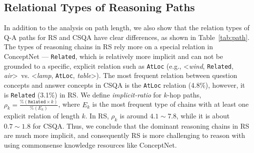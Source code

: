 \subsection{Relational Types of Reasoning Paths}
In addition to the analysis on path length, we also show that the relation types of Q-A paths for RS and CSQA have clear differences, as shown in Table~\ref{tab:path}.
The types of reasoning chains in RS rely more on a special relation in ConceptNet --- \texttt{Related}, which is relatively more implicit and can not be grounded to a specific, explicit relation such as \texttt{AtLoc} (e.g., \textless\textit{wind}, \texttt{Related}, \textit{air}\textgreater ~vs. \textless\textit{lamp}, \texttt{AtLoc}, \textit{table}\textgreater).
The most frequent relation between question concepts and answer concepts in CSQA is the \texttt{AtLoc} relation (4.8\%), however, it is \texttt{Related} (3.1\%) in RS.
We define \textit{implicit-ratio} for $k$-hop paths, 
$\rho_k=\frac{\% (\texttt{Related}\times k)}{\% (E_k)}$,
where $E_k$ is the most frequent type of chains with at least one explicit relation of length $k$.
In RS, $\rho_k$ is around $4.1\sim7.8$, while it is about $0.7\sim1.8$ for CSQA.
Thus, we conclude that the dominant reasoning chains in RS are much more implicit, and consequently RS is more challenging to reason with using commonsense knowledge resources like ConceptNet.



